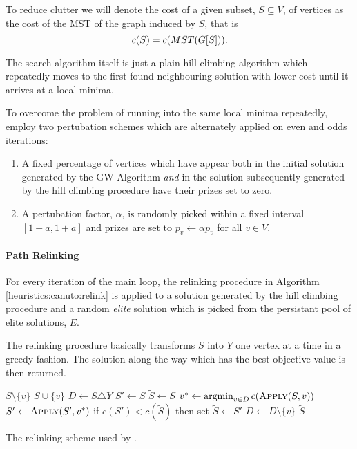 To reduce clutter we will denote the cost
of a given subset, $S \subseteq V$, of vertices as the cost
of the MST of the graph induced by $S$, that is
$$c(S) = c(MST(G[S]))\mathnormal{.}$$

The search algorithm itself is just a plain hill-climbing algorithm which repeatedly
 moves to the first
 found neighbouring solution with lower cost until it arrives at a local minima.

 To overcome the problem of running into the same local minima repeatedly,
 \citet{canuto2001local} employ two pertubation schemes which are alternately applied
 on even and odds iterations:
 \begin{enumerate}
 \item A fixed percentage of vertices which have appear both in the initial solution generated
   by the GW Algorithm \textit{and}  in the solution subsequently generated by
    the hill climbing procedure have their prizes
    set to zero.
  \item A pertubation factor, $\alpha$, is randomly picked within a fixed interval $[1 -a, 1+a]$
    and prizes are set to $p_v \gets \alpha p_v$ for all $v \in V$.
 \end{enumerate}

\paragraph{Path Relinking}
For every iteration of the main loop, the relinking procedure in Algorithm \ref{heuristics:canuto:relink}
is applied to a solution generated by the hill climbing procedure and 
a random \textit{elite} solution which is picked from the
persistant pool of elite solutions, $E$.

The relinking procedure basically transforms $S$ into $Y$ one vertex at a time in a greedy fashion.
The solution along the way which has the best objective value is then returned.
 \begin{algorithm}[h!]
   \begin{algorithmic}[1]
     \State \Return $S \setminus \{v\}$
     \Else
     \State \Return $S \cup \{v\}$
     \EndIf
     \EndProcedure
     \State $D \gets S \triangle Y$
     \State $S' \gets S$
     \State $\tilde{S} \gets S$
     \State $v^* \gets \argmin_{v \in D} c(\Call{Apply}{S,v})$
     \State $S' \gets \Call{Apply}{S', v^*}$
     \State if $c(S') < c(\tilde{S})$ then set $\tilde{S} \gets S'$
     \State $D \gets D \setminus \{v\}$
     \EndWhile
     \State \Return $\tilde{S}$
     \EndProcedure
 \end{algorithmic}
 \caption{The relinking scheme used by \citet{canuto2001local}.}\label{heuristics:canuto:relink}
 \end{algorithm}

